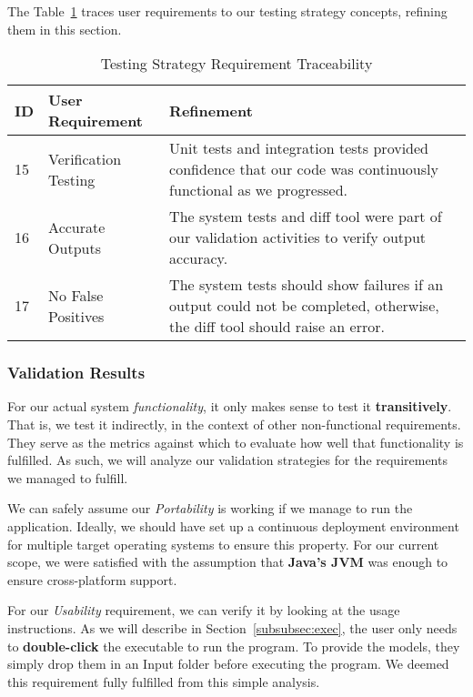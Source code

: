 The Table~\ref{tab:test-strat-table} traces user requirements to our testing strategy concepts, refining them in this section.
\begin{table}[htbp]
    \centering
    \caption{Testing Strategy Requirement Traceability}\label{tab:test-strat-table}
    \begin{tabularx}{\textwidth}{| l | l | X |}
        \hline
        \textbf{ID} & \textbf{User Requirement} & \textbf{Refinement} \\
        \hline
        15 & Verification Testing & Unit tests and integration tests provided confidence that our code was continuously functional as we progressed. \\ \hline
        16 & Accurate Outputs & The system tests and diff tool were part of our validation activities to verify output accuracy. \\ \hline
        17 & No False Positives & The system tests should show failures if an output could not be completed, otherwise, the diff tool should raise an error. \\ \hline
    \end{tabularx}
\end{table}
\newpage
\subsubsection{Validation Results}\label{subsubsec:test-validation}
For our actual system \textit{functionality}, it only makes sense to test it \textbf{transitively}.
That is, we test it indirectly, in the context of other non-functional requirements.
They serve as the metrics against which to evaluate how well that functionality is fulfilled.
As such, we will analyze our validation strategies for the requirements we managed to fulfill.

We can safely assume our \textit{Portability} is working if we manage to run the application.
Ideally, we should have set up a continuous deployment environment for multiple target operating systems to ensure this property.
For our current scope, we were satisfied with the assumption that
\textbf{Java's JVM} was enough to ensure cross-platform support.

For our \textit{Usability} requirement, we can verify it by looking at the usage instructions.
As we will describe in Section~\ref{subsubsec:exec}, the user only needs to \textbf{double-click} the executable to run the program.
To provide the models, they simply drop them in an Input folder before executing the program.
We deemed this requirement fully fulfilled from this simple analysis.

